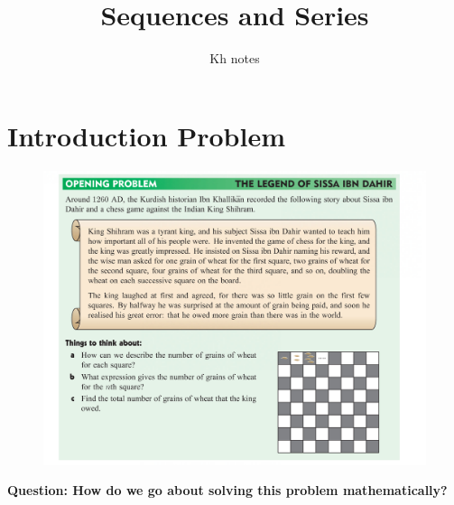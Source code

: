 \documentclass[12pt]{article}
\title{Sequences and Series}
\author{Kh notes}
\date{}
\begin{document}
	\maketitle
\tableofcontents
\newpage
\section*{Introduction Problem}
\begin{figure}[!h]
	\centering
\includegraphics[width=17cm]{ChessProblem.png} 
\end{figure}

\textbf{Question: How do we go about solving this problem mathematically?}
\end{document}
